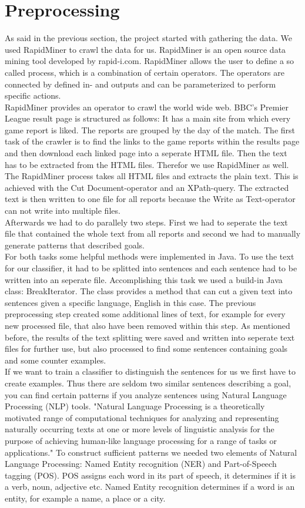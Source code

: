 \documentclass[11pt,titlepage,oneside,openany]{book}
\begin{document}
\section{Preprocessing}
As said in the previous section, the project started with gathering the data. We  used RapidMiner to crawl the data for us. RapidMiner is an open source data mining tool developed by rapid-i.com. RapidMiner allows the user to define a so called process, which is a combination of certain operators. The operators are connected by defined in- and outputs and can be parameterized to perform specific actions. \\
RapidMiner provides an operator to crawl the world wide web. BBC's Premier League result page is structured as follows: It has a main site from which every game report is liked. The reports are grouped by the day of the match. The first task of the crawler is to find the links to the game reports within the results page and then download each linked page into a seperate HTML file. Then the text has to be extracted from the HTML files. Therefor we use RapidMiner as well. The RapidMiner process takes all HTML files and extracts the plain text. This is achieved with the Cut Document-operator and an XPath-query. The extracted text is then written to one file for all reports because the Write as Text-operator can not write into multiple files. \\ 
Afterwards we had to do parallely two steps. First we had to seperate the text file that contained the whole text from all reports and second we had to manually generate patterns that described goals. \\
For both tasks some helpful methods were implemented in Java. To use the text for our classifier, it had to be splitted into sentences and each sentence had to be written into an seperate file. Accomplishing this task we used a build-in Java class: BreakIterator. The class provides a method that can cut a given text into sentences given a specific language, English in this case. The previous preprocessing step created some additional lines of text, for example for every new processed file, that also have been removed within this step. As mentioned before, the results of the text splitting were saved and written into seperate text files for further use, but also processed to find some sentences containing goals and some counter examples. \\
If we want to train a classifier to distinguish the sentences for us we first have to create examples. Thus there are seldom two similar sentences describing a goal, you can find certain patterns if you analyze sentences using Natural Language Processing (NLP) tools. "Natural Language Processing is a theoretically motivated range of computational techniques for analyzing and representing naturally occurring texts at one or more levels of linguistic analysis for the purpose of achieving human-like language processing for a range of tasks or applications." \citep[p.1]{Liddy2001} To construct sufficient patterns we needed two elements of Natural Language Processing: Named Entity recognition (NER) and Part-of-Speech tagging (POS). POS assigns each word in its part of speech, it determines if it is a verb, noun, adjective etc. Named Entity recognition determines if a word is an entity, for example a name, a place or a city.  
\end{document}
